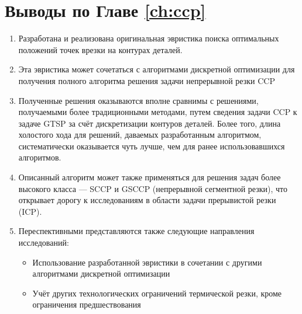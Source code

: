 
\section{Выводы по Главе \ref{ch:ccp}}
\label{sec:ccp.conclude}

\begin{enumerate}
  \item
  Разработана и реализована оригинальная эвристика
  поиска оптимальных положений точек врезки
  на контурах деталей.
  \item
  Эта эвристика может сочетаться с алгоритмами
  дискретной оптимизации для получения
  полного алгоритма решения задачи непрерывной резки
  CCP
  \item
  Полученные решения оказываются вполне сравнимы
  с решениями, получаемыми более традиционными методами,
  путем сведения задачи CCP к задаче GTSP за счёт
  дискретизации контуров деталей.
  Более того, длина холостого хода
  для решений, даваемых разработанным алгоритмом,
  систематически оказывается чуть лучше,
  чем для ранее использовавшихся алгоритмов.
  \item
  Описанный алгоритм может также применяться
  для решения задач более высокого класса ---
  SCCP и GSCCP (непрерывной сегментной резки),
  что открывает дорогу к исследованиям в области
  задачи прерывистой резки (ICP).
  \item
  Переспективными представляются также следующие
  направления исследований:
  \begin{itemize}
    \item
    Использование разработанной эвристики
    в сочетании с другими алгоритмами дискретной оптимизации
    \item
    Учёт других технологических ограничений термической резки,
    кроме ограничения предшествования
  \end{itemize}
\end{enumerate}
